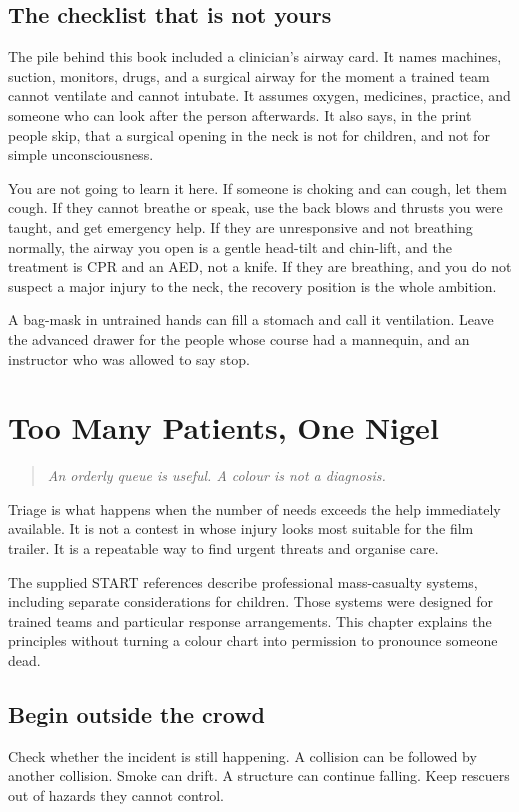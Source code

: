 \documentclass[10pt,openright]{book}
\begin{document}
\section*{The checklist that is not yours}
The pile behind this book included a clinician's airway card. It names machines, suction, monitors, drugs, and a surgical airway for the moment a trained team cannot ventilate and cannot intubate. It assumes oxygen, medicines, practice, and someone who can look after the person afterwards. It also says, in the print people skip, that a surgical opening in the neck is not for children, and not for simple unconsciousness.

You are not going to learn it here. If someone is choking and can cough, let them cough. If they cannot breathe or speak, use the back blows and thrusts you were taught, and get emergency help. If they are unresponsive and not breathing normally, the airway you open is a gentle head-tilt and chin-lift, and the treatment is CPR and an AED, not a knife. If they are breathing, and you do not suspect a major injury to the neck, the recovery position is the whole ambition.

A bag-mask in untrained hands can fill a stomach and call it ventilation. Leave the advanced drawer for the people whose course had a mannequin, and an instructor who was allowed to say stop.

\chapter{Too Many Patients, One Nigel}
\begin{quote}\emph{An orderly queue is useful. A colour is not a diagnosis.}\end{quote}
Triage is what happens when the number of needs exceeds the help immediately available. It is not a contest in whose injury looks most suitable for the film trailer. It is a repeatable way to find urgent threats and organise care.

The supplied START references describe professional mass-casualty systems, including separate considerations for children. Those systems were designed for trained teams and particular response arrangements. This chapter explains the principles without turning a colour chart into permission to pronounce someone dead.

\section*{Begin outside the crowd}
Check whether the incident is still happening. A collision can be followed by another collision. Smoke can drift. A structure can continue falling. Keep rescuers out of hazards they cannot control.
\end{document}

